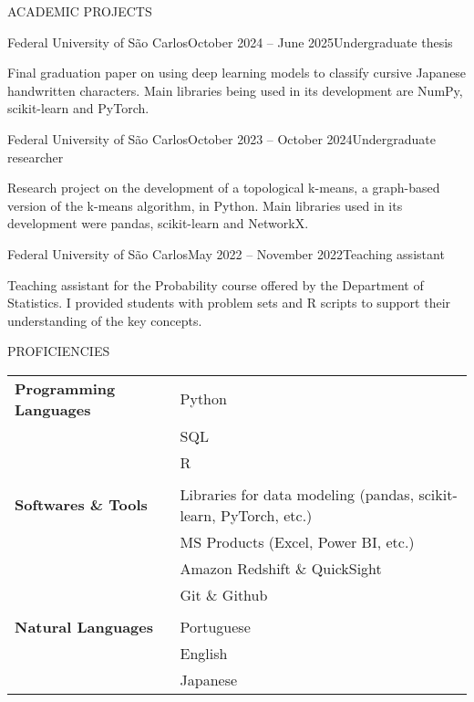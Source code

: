 \documentclass[
	11pt, %
]{cv} %
\begin{document}
\begin{rSection}{ACADEMIC PROJECTS}
    \begin{rSubsection}{Federal University of São Carlos}{October 2024 -- June 2025}{}{Undergraduate thesis}
        \item Final graduation paper on using deep learning models to classify cursive Japanese handwritten characters. Main libraries being used in its development are NumPy, scikit-learn and PyTorch.
    \end{rSubsection}

    \begin{rSubsection}{Federal University of São Carlos}{October 2023 -- October 2024}{}{Undergraduate researcher}
        \item Research project on the development of a topological k-means, a graph-based version of the k-means algorithm, in Python. Main libraries used in its development were pandas, scikit-learn and NetworkX.
    \end{rSubsection}
    
    \begin{rSubsection}{Federal University of São Carlos}{May 2022 -- November 2022}{}{Teaching assistant}
	\item Teaching assistant for the Probability course offered by the Department of Statistics. I provided students with problem sets and R scripts to support their understanding of the key concepts.
    \end{rSubsection}

	

\end{rSection}

\begin{rSection}{PROFICIENCIES}

	\begin{tabular}{@{} >{\bfseries}l | l @{}}
		Programming Languages & Python \\
                                      & SQL \\
                                      & R \\
            \multicolumn{2}{c}{} \\	%
        Softwares \& Tools & Libraries for data modeling (pandas, scikit-learn, PyTorch, etc.) \\
                           & MS Products (Excel, Power BI, etc.)\\
                           & Amazon Redshift \& QuickSight\\
                           & Git \& Github\\
            \multicolumn{2}{c}{} \\	%
            Natural Languages & Portuguese \\
                    & English \\
                    & Japanese
	\end{tabular}
 
\end{rSection}
\end{document}
